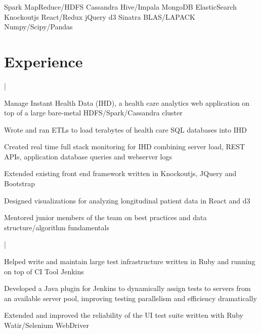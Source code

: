 \documentclass[]{deedy-resume-openfont}
\begin{document}
 \descript{}
\vspace{1pt}
Spark \textbullet{} MapReduce/HDFS \textbullet{} Cassandra \textbullet{} Hive/Impala \textbullet{} MongoDB \textbullet{} ElasticSearch \\
Knockoutjs \textbullet{} React/Redux \textbullet{} jQuery \textbullet{} d3 \textbullet{} Sinatra \textbullet{} BLAS/LAPACK \textbullet{} Numpy/Scipy/Pandas
\sectionsep


\vspace{-5pt}
\section{Experience}

|
\begin{tightemize}
\item Manage Instant Health Data (IHD), a health care analytics web application on top of a large bare-metal HDFS/Spark/Cassandra cluster
\item Wrote and ran ETLs to load terabytes of health care SQL databases into IHD
\item Created real time full stack monitoring for IHD combining server load, REST APIs, application database queries and webserver logs
\item Extended existing front end framework written in Knockoutjs, JQuery and Bootstrap
\item Designed visualizations for analyzing longitudinal patient data in React and d3
\item Mentored junior members of the team on best practices and data structure/algorithm fundamentals
\end{tightemize}
\sectionsep

|
\begin{tightemize}
\item Helped write and maintain large test infrastructure written in Ruby and running on top of CI Tool Jenkins
\item Developed a Java plugin for Jenkins to dynamically assign tests to servers from an available server pool, improving testing parallelism and efficiency dramatically
\item Extended and improved the reliability of the UI test suite written with Ruby Watir/Selenium WebDriver
\end{tightemize}
\sectionsep
\end{document}
